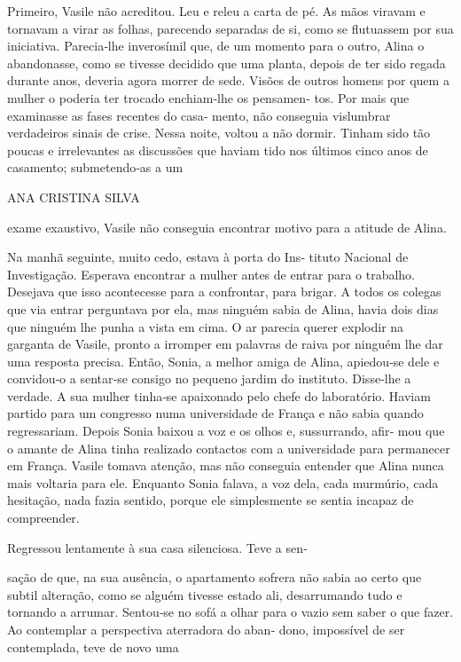 Primeiro, Vasile não acreditou. Leu e releu a carta de pé. As mãos
viravam e tornavam a virar as folhas, parecendo separadas de si, como se
flutuassem por sua iniciativa. Parecia‑lhe inverosímil que, de um
momento para o outro, Alina o abandonasse, como se tivesse decidido que
uma planta, depois de ter sido regada durante anos, deveria agora morrer
de sede. Visões de outros homens por quem a mulher o poderia ter trocado
enchiam‑lhe os pensamen‑ tos. Por mais que examinasse as fases recentes
do casa‑ mento, não conseguia vislumbrar verdadeiros sinais de crise.
Nessa noite, voltou a não dormir. Tinham sido tão poucas e irrelevantes
as discussões que haviam tido nos últimos cinco anos de casamento;
submetendo‑as a um

ANA CRISTINA SILVA

exame exaustivo, Vasile não conseguia encontrar motivo para a atitude de
Alina.

Na manhã seguinte, muito cedo, estava à porta do Ins‑ tituto Nacional de
Investigação. Esperava encontrar a mulher antes de entrar para o
trabalho. Desejava que isso acontecesse para a confrontar, para brigar.
A todos os colegas que via entrar perguntava por ela, mas ninguém sabia
de Alina, havia dois dias que ninguém lhe punha a vista em cima. O ar
parecia querer explodir na garganta de Vasile, pronto a irromper em
palavras de raiva por ninguém lhe dar uma resposta precisa. Então,
Sonia, a melhor amiga de Alina, apiedou‑se dele e convidou‑o a sentar‑se
consigo no pequeno jardim do instituto. Disse‑lhe a verdade. A sua
mulher tinha‑se apaixonado pelo chefe do laboratório. Haviam partido
para um congresso numa universidade de França e não sabia quando
regressariam. Depois Sonia baixou a voz e os olhos e, sussurrando, afir‑
mou que o amante de Alina tinha realizado contactos com a universidade
para permanecer em França. Vasile tomava atenção, mas não conseguia
entender que Alina nunca mais voltaria para ele. Enquanto Sonia falava,
a voz dela, cada murmúrio, cada hesitação, nada fazia sentido, porque
ele simplesmente se sentia incapaz de compreender.

Regressou lentamente à sua casa silenciosa. Teve a sen‑

sação de que, na sua ausência, o apartamento sofrera não sabia ao certo
que subtil alteração, como se alguém tivesse estado ali, desarrumando
tudo e tornando a arrumar. Sentou‑se no sofá a olhar para o vazio sem
saber o que fazer. Ao contemplar a perspectiva aterradora do aban‑ dono,
impossível de ser contemplada, teve de novo uma

